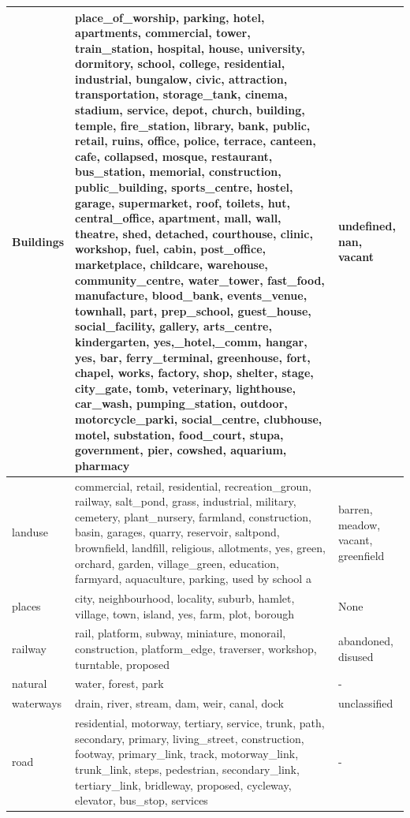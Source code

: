 \documentclass[a4paper,12pt]{Classes/RoboticsLaTeX}
\begin{document}
{\begin{longtable}{|p{2cm}|p{9cm}|p{2cm}|}
		Buildings & place\_of\_worship, parking, hotel, apartments, commercial, tower, train\_station, hospital, house, university, dormitory, school, college, residential, industrial, bungalow, civic, attraction, transportation, storage\_tank, cinema, stadium, service, depot, church, building, temple, fire\_station, library, bank, public, retail, ruins, office, police, terrace, canteen, cafe, collapsed, mosque, restaurant, bus\_station, memorial, construction, public\_building, sports\_centre, hostel, garage, supermarket, roof, toilets, hut, central\_office, apartment, mall, wall, theatre, shed, detached, courthouse, clinic, workshop, fuel, cabin, post\_office, marketplace, childcare, warehouse, community\_centre, water\_tower, fast\_food, manufacture, blood\_bank, events\_venue, townhall, part, prep\_school, guest\_house, social\_facility, gallery, arts\_centre, kindergarten, yes,\_hotel,\_comm, hangar, yes, bar, ferry\_terminal, greenhouse, fort, chapel, works, factory, shop, shelter, stage, city\_gate, tomb, veterinary, lighthouse, car\_wash, pumping\_station, outdoor, motorcycle\_parki, social\_centre, clubhouse, motel, substation, food\_court, stupa, government, pier, cowshed, aquarium, pharmacy & undefined, nan, vacant \\
		\hline
		landuse & commercial, retail, residential, recreation\_groun, railway, salt\_pond, grass, industrial, military, cemetery, plant\_nursery, farmland, construction, basin, garages, quarry, reservoir, saltpond, brownfield, landfill, religious, allotments, yes, green, orchard, garden, village\_green, education, farmyard, aquaculture, parking, used by school a & barren, meadow, vacant, greenfield \\
		\hline
		places & city, neighbourhood, locality, suburb, hamlet, village, town, island, yes, farm, plot, borough & None \\
		\hline
		railway & rail, platform, subway, miniature, monorail, construction, platform\_edge, traverser, workshop, turntable, proposed & abandoned, disused \\
		\hline
		natural & water, forest, park & - \\
		\hline
		waterways & drain, river, stream, dam, weir, canal, dock & unclassified \\
		\hline
		road & residential, motorway, tertiary, service, trunk, path, secondary, primary, living\_street, construction, footway, primary\_link, track, motorway\_link, trunk\_link, steps, pedestrian, secondary\_link, tertiary\_link, bridleway, proposed, cycleway, elevator, bus\_stop, services & - \\

\end{longtable}}
\end{document}

